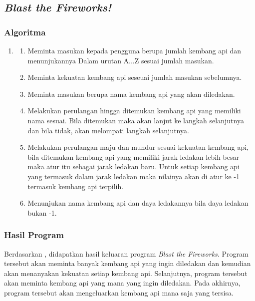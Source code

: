 \documentclass{subfiles}
\begin{document}
\subsection{\textit{Blast the Fireworks!}}
\subsubsection{Algoritma}
\begin{enumerate}
    \item []
    \begin{enumerate}
        \item{Meminta masukan kepada pengguna berupa jumlah kembang api dan menunjukannya
                    Dalam urutan A...Z sesuai jumlah masukan.}
        \item{Meminta kekuatan kembang api seseuai jumlah masukan sebelumnya.}
        \item{Meminta masukan berupa nama kembang api yang akan diledakan.}
        \item{Melakukan perulangan hingga ditemukan kembang api yang memiliki nama sesuai.
                    Bila ditemukan maka akan lanjut ke langkah selanjutnya dan bila tidak, akan
                    melompati langkah selanjutnya.}
        \item{Melakukan perulangan maju dan mundur sesuai kekuatan kembang api,
                    bila ditemukan kembang api yang memiliki jarak ledakan lebih besar maka atur itu
                    sebagai jarak ledakan baru. Untuk setiap kembang api yang termasuk dalam jarak
                    ledakan maka nilainya akan di atur ke -1 termasuk kembang api terpilih.}
        \item{Menunjukan nama kembang api dan daya ledakannya bila daya ledakan bukan -1.}
    \end{enumerate}
\end{enumerate}

\subsubsection{\Flowchart}
\newpage
\subsubsectionf{{\Source} {\sCode}}
\vspace{-1ex}

\subsubsection{Hasil Program}
\begin{indentpar}
    \hspace{\parindent}Berdasarkan , didapatkan hasil keluaran program \textit{Blast the Fireworks}. Program tersebut akan meminta banyak kembang api yang ingin diledakan dan kemudian akan menanyakan kekuatan setiap kembang api. Selanjutnya, program tersebut akan meminta kembang api yang mana yang ingin diledakan. Pada akhirnya, program tersebut akan mengeluarkan kembang api mana saja yang tersisa.
\end{indentpar}
\end{document}
